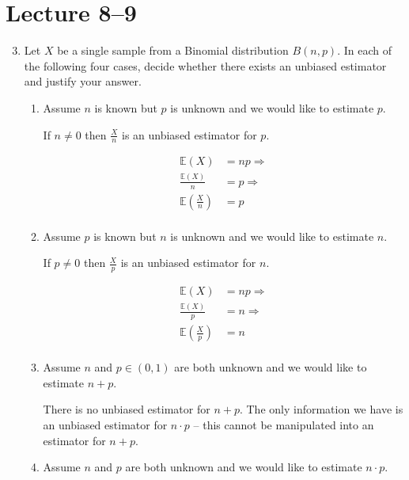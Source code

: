 \documentclass[10pt,\jkfside,a4paper]{article}
\begin{document}
\section*{Lecture 8--9}

\begin{enumerate}

\setcounter{enumi}{2}

\item Let $X$ be a single sample from a Binomial distribution $B(n, p)$.
In each of the following four cases, decide whether there exists an unbiased estimator and justify your answer.

\begin{enumerate}

\item Assume $n$ is known but $p$ is unknown and we would like to estimate $p$.

If $n \neq 0$ then $\frac{X}{n}$ is an unbiased estimator for $p$.

\[
\begin{split}
\mathbb{E}(X) &= np \Longrightarrow \\
\frac{\mathbb{E}(X)}{n} &= p \Longrightarrow \\
\mathbb{E}\left( \frac{X}{n} \right) &= p \\
\end{split}
\]

\item Assume $p$ is known but $n$ is unknown and we would like to estimate $n$.

If $p \neq 0$ then $\frac{X}{p}$ is an unbiased estimator for $n$.

\[
\begin{split}
\mathbb{E}(X) &= np \Longrightarrow \\
\frac{\mathbb{E}(X)}{p} &= n \Longrightarrow \\
\mathbb{E}\left( \frac{X}{p} \right) &= n \\
\end{split}
\]

\item Assume $n$ and $p \in (0, 1)$ are both unknown and we would like to estimate $n + p$.

There is no unbiased estimator for $n + p$. The only information we have is an unbiased estimator for
$n \cdot p$ -- this cannot be manipulated into an estimator for $n + p$.

\item Assume $n$ and $p$ are both unknown and we would like to estimate $n \cdot p$.


\end{enumerate}
\end{enumerate}
\end{document}
